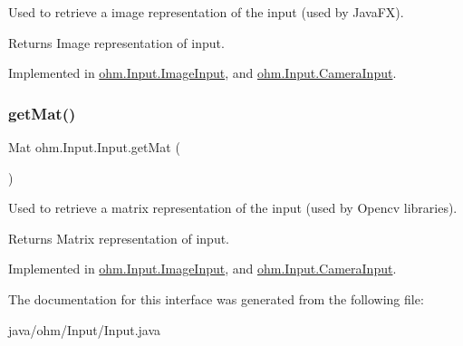 Used to retrieve a image representation of the input (used by Java\+FX). \begin{DoxyReturn}{Returns}
Image representation of input. 
\end{DoxyReturn}


Implemented in \hyperlink{classohm_1_1_input_1_1_image_input_a589cf238e644e9bd38a1473fedf2399c}{ohm.\+Input.\+Image\+Input}, and \hyperlink{classohm_1_1_input_1_1_camera_input_a5cd3267a481374402aeb15ddc48d8836}{ohm.\+Input.\+Camera\+Input}.

\hypertarget{interfaceohm_1_1_input_1_1_input_a9e65aa172b8ea1add3c2f09df554f198}{}\label{interfaceohm_1_1_input_1_1_input_a9e65aa172b8ea1add3c2f09df554f198} 
\subsubsection{\texorpdfstring{get\+Mat()}{getMat()}}
{\footnotesize\ttfamily Mat ohm.\+Input.\+Input.\+get\+Mat (\begin{DoxyParamCaption}{ }\end{DoxyParamCaption})}

Used to retrieve a matrix representation of the input (used by Opencv libraries). \begin{DoxyReturn}{Returns}
Matrix representation of input. 
\end{DoxyReturn}


Implemented in \hyperlink{classohm_1_1_input_1_1_image_input_a25141276b489aa062e7c855cb35c3b14}{ohm.\+Input.\+Image\+Input}, and \hyperlink{classohm_1_1_input_1_1_camera_input_a9717b65589c2edfeac13f0c4a3e85b4d}{ohm.\+Input.\+Camera\+Input}.



The documentation for this interface was generated from the following file\+:\begin{DoxyCompactItemize}
\item 
java/ohm/\+Input/Input.\+java\end{DoxyCompactItemize}
